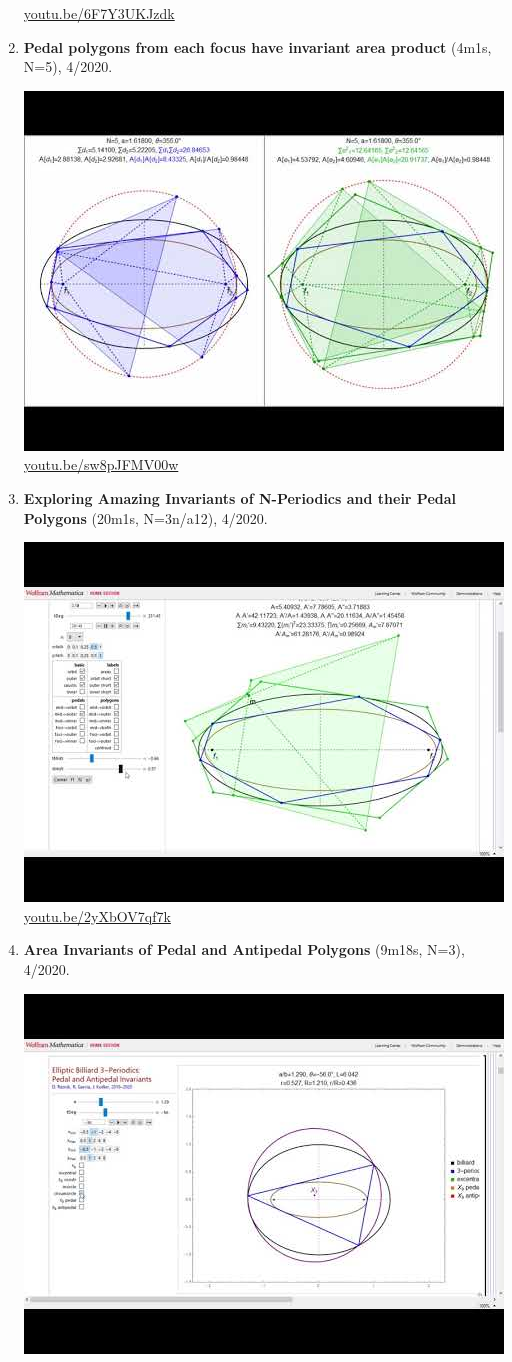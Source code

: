 \documentclass[12pt]{amsart}
\begin{document}
\begin{enumerate}[resume]
\begin{center}
\href{https://youtu.be/6F7Y3UKJzdk}{\url{youtu.be/6F7Y3UKJzdk}}\end{center}
% 
\item \textbf{Pedal polygons from each focus have invariant area product} (4m1s, N=5), 4/2020. 
\begin{center}\includegraphics[width=.5\textwidth]{pics/sw8pJFMV00w.jpg} \\ 
\href{https://youtu.be/sw8pJFMV00w}{\url{youtu.be/sw8pJFMV00w}}\end{center}
% 
\item \textbf{Exploring Amazing Invariants of N-Periodics and their Pedal Polygons} (20m1s, N=3n/a12), 4/2020. 
\begin{center}\includegraphics[width=.5\textwidth]{pics/2yXbOV7qf7k.jpg} \\ 
\href{https://youtu.be/2yXbOV7qf7k}{\url{youtu.be/2yXbOV7qf7k}}\end{center}
% 
\item \textbf{Area Invariants of Pedal and Antipedal Polygons} (9m18s, N=3), 4/2020. 
\begin{center}\includegraphics[width=.5\textwidth]{pics/LN623VjeeFQ.jpg} \\ 

\end{center}
\end{enumerate}
\end{document}
